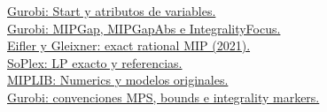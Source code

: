 \documentclass[10pt,a4paper]{article}
\begin{document}
\small
\href{https://docs.gurobi.com/projects/optimizer/en/current/reference/attributes/variable.html}{Gurobi: Start y atributos de variables.}\\
\href{https://docs.gurobi.com/projects/optimizer/en/current/reference/parameters.html}{Gurobi: MIPGap, MIPGapAbs e IntegralityFocus.}\\
\href{https://arxiv.org/abs/2101.09141}{Eifler y Gleixner: exact rational MIP (2021).}\\
\href{https://soplex.zib.de/doc/html/EXACT.php}{SoPlex: LP exacto y referencias.}\\
\href{https://miplib.zib.de/tag_numerics.html}{MIPLIB: Numerics y modelos originales.}\\
\href{https://docs.gurobi.com/projects/optimizer/en/current/reference/fileformats/modelformats.html}{Gurobi: convenciones MPS, bounds e integrality markers.}
\end{document}
